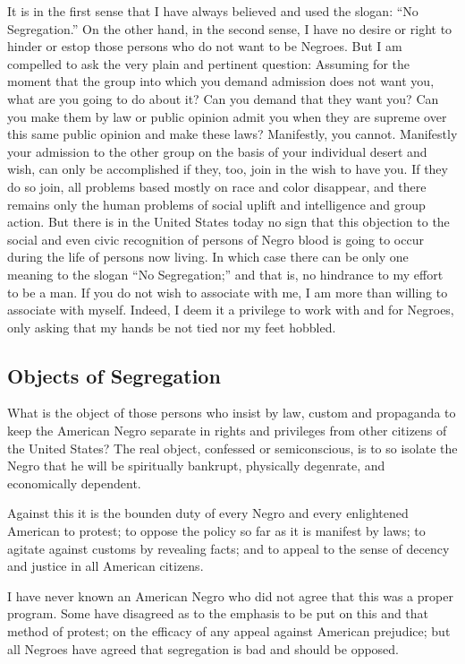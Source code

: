 \documentclass[letterpaper,10pt,english]{jupyterBook}
\begin{document}
\sphinxAtStartPar
It is in the first sense that I have always believed and used the slogan: “No Segregation.” On the other hand, in the second sense, I have no desire or right to hinder or estop those persons who do not want to be Negroes. But I am compelled to ask the very plain and pertinent question: Assuming for the moment that the group into which you demand admission does not want you, what are you going to do about it? Can you demand that they want you? Can you make them by law or public opinion admit you when they are supreme over this same public opinion and make these laws? Manifestly, you cannot. Manifestly your admission to the other group on the basis of your individual desert and wish, can only be accomplished if they, too, join in the wish to have you. If they do so join, all problems based mostly on race and color disappear, and there remains only the human problems of social uplift and intelligence and group action. But there is in the United States today no sign that this objection to the social and even civic recognition of persons of Negro blood is going to occur during the life of persons now living. In which case there can be only one meaning to the slogan “No Segregation;” and that is, no hindrance to my effort to be a man. If you do not wish to associate with me, I am more than willing to associate with myself. Indeed, I deem it a privilege to work with and for Negroes, only asking that my hands be not tied nor my feet hobbled.


\subsection{Objects of Segregation}
\label{\detokenize{Volumes/41/04/segregation_in_the_north:objects-of-segregation}}
\sphinxAtStartPar
What is the object of those persons who insist by law, custom and propaganda to keep the American Negro separate in rights and privileges from other citizens of the United States? The  real object, confessed or semiconscious, is to so isolate the Negro that he will be spiritually bankrupt, physically degenrate, and economically dependent.

\sphinxAtStartPar
Against this it is the bounden duty of every Negro and every enlightened American to protest; to oppose the policy so far as it is manifest by laws; to agitate against customs by revealing facts; and to appeal to the sense of decency and justice in all American citizens.

\sphinxAtStartPar
I have never known an American Negro who did not agree that this was a proper program. Some have disagreed as to the emphasis to be put on this and that method of protest; on the efficacy of any appeal against American prejudice; but all Negroes have agreed that segregation is bad and should be opposed.
\end{document}
